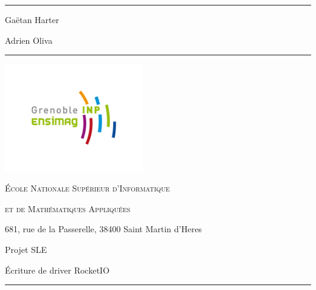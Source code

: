 \documentclass[a4paper,10pt]{article}
\begin{document}
\begin{minipage}[c]{0.45\linewidth}
\rule{5cm}{1pt}

Gaëtan Harter

Adrien Oliva

\rule{5cm}{1pt}
\end{minipage} \hfill
\begin{minipage}[c]{0.45\linewidth}
\begin{flushright}
\vspace{5mm}\includegraphics[width=6cm]{../img/ensimag.png}

\footnotesize{\textsc{\'Ecole Nationale Sup\'erieur d'Informatique}}

\footnotesize{\textsc{ et de Math\'ematiques Appliqu\'ees}}

\footnotesize{681, rue de la Passerelle, 38400 Saint Martin d'Heres}
\end{flushright}
\end{minipage}

\vspace{2cm}

\begin{center}

\begin{LARGE}
Projet SLE
\end{LARGE}

\begin{LARGE}
Écriture de driver RocketIO
\end{LARGE}

\vspace{5mm}

\begin{Large}
\TITLE
\end{Large}

\rule{6cm}{2pt}
\end{center}

\vspace{25mm}
\end{document}

